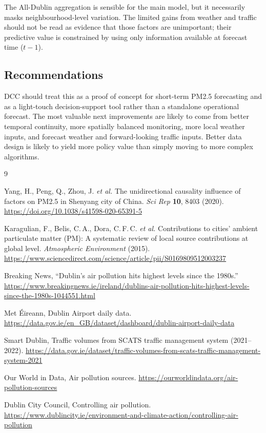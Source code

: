 \documentclass[11pt,a4paper]{article}
\begin{document}
	The All-Dublin aggregation is sensible for the main model, but it necessarily masks neighbourhood-level variation. The limited gains from weather and traffic should not be read as evidence that those factors are unimportant; their predictive value is constrained by using only information available at forecast time (\(t-1\)).
	
	\subsection*{Recommendations}
	
	DCC should treat this as a proof of concept for short-term PM2.5 forecasting and as a light-touch decision-support tool rather than a standalone operational forecast. The most valuable next improvements are likely to come from better temporal continuity, more spatially balanced monitoring, more local weather inputs, and forecast weather and forward-looking traffic inputs. Better data design is likely to yield more policy value than simply moving to more complex algorithms.
	
	\vspace{5cm}
	
	\begin{thebibliography}{9}
		
		Yang, H., Peng, Q., Zhou, J. \emph{et al.} The unidirectional causality influence of factors on PM2.5 in Shenyang city of China. \emph{Sci Rep} \textbf{10}, 8403 (2020). \url{https://doi.org/10.1038/s41598-020-65391-5}
		
		Karagulian, F., Belis, C.\,A., Dora, C.\,F.\,C. \emph{et al.} Contributions to cities' ambient particulate matter (PM): A systematic review of local source contributions at global level. \emph{Atmospheric Environment} (2015). \url{https://www.sciencedirect.com/science/article/pii/S0169809512003237}
		
		Breaking News, ``Dublin's air pollution hits highest levels since the 1980s.'' \url{https://www.breakingnews.ie/ireland/dublins-air-pollution-hits-highest-levels-since-the-1980s-1044551.html}
		
		Met \'Eireann, Dublin Airport daily data. \url{https://data.gov.ie/en_GB/dataset/dashboard/dublin-airport-daily-data}
		
		Smart Dublin, Traffic volumes from SCATS traffic management system (2021--2022). \url{https://data.gov.ie/dataset/traffic-volumes-from-scats-traffic-management-system-2021}
		
		Our World in Data, Air pollution sources. \url{https://ourworldindata.org/air-pollution-sources}
		
		Dublin City Council, Controlling air pollution. \url{https://www.dublincity.ie/environment-and-climate-action/controlling-air-pollution}
		
	\end{thebibliography}
	
\end{document}
